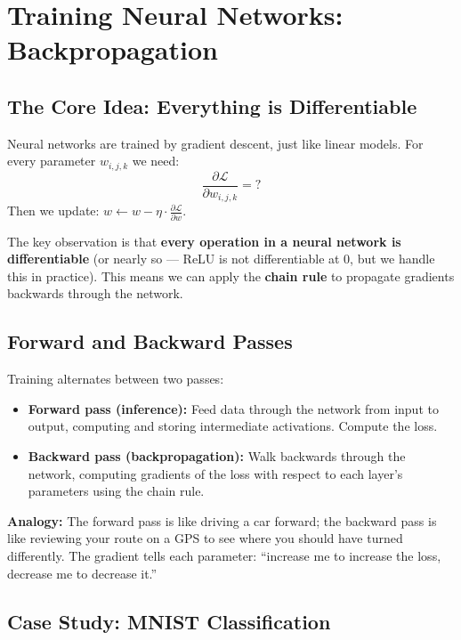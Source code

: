 \documentclass[12pt]{article}
\begin{document}
\section{Training Neural Networks: Backpropagation}

\subsection{The Core Idea: Everything is Differentiable}

Neural networks are trained by gradient descent, just like linear models. For every parameter $w_{i,j,k}$ we need:
\[
\frac{\partial \mathcal{L}}{\partial w_{i,j,k}} = ?
\]
Then we update: $w \leftarrow w - \eta \cdot \frac{\partial \mathcal{L}}{\partial w}$.

The key observation is that \textbf{every operation in a neural network is differentiable} (or nearly so --- ReLU is not differentiable at 0, but we handle this in practice). This means we can apply the \textbf{chain rule} to propagate gradients backwards through the network.

\subsection{Forward and Backward Passes}

Training alternates between two passes:
\begin{itemize}
  \item \textbf{Forward pass (inference):} Feed data through the network from input to output, computing and storing intermediate activations. Compute the loss.
  \item \textbf{Backward pass (backpropagation):} Walk backwards through the network, computing gradients of the loss with respect to each layer's parameters using the chain rule.
\end{itemize}

\begin{takeawaybox}
\textbf{Analogy:} The forward pass is like driving a car forward; the backward pass is
like reviewing your route on a GPS to see where you should have turned differently.
The gradient tells each parameter: ``increase me to increase the loss, decrease me to
decrease it.''
\end{takeawaybox}

\subsection{Case Study: MNIST Classification}
\end{document}
